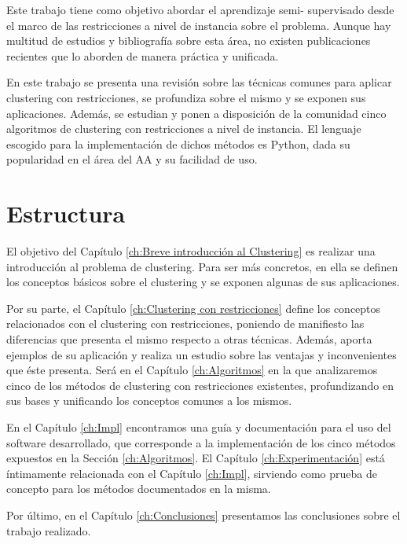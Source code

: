 Este trabajo tiene como objetivo abordar el aprendizaje semi- supervisado desde el marco de las restricciones a nivel de instancia sobre el problema. Aunque hay multitud de estudios y bibliografía sobre esta área, no existen publicaciones recientes que lo aborden de manera práctica y unificada.

En este trabajo se presenta una revisión sobre las técnicas comunes para aplicar clustering con restricciones, se profundiza sobre el mismo y se exponen sus aplicaciones. Además, se estudian y ponen a disposición de la comunidad cinco algoritmos de clustering con restricciones a nivel de instancia. El lenguaje escogido para la implementación de dichos métodos es Python, dada su popularidad en el área del \acs{AA} y su facilidad de uso.

\section{Estructura}

El objetivo del Capítulo \ref{ch:Breve introducción al Clustering} es realizar una introducción al problema de clustering. Para ser más concretos, en ella se definen los conceptos básicos sobre el clustering y se exponen algunas de sus aplicaciones.

Por su parte, el Capítulo \ref{ch:Clustering con restricciones} define los conceptos relacionados con el clustering con restricciones, poniendo de manifiesto las diferencias que presenta el mismo respecto a otras técnicas. Además, aporta ejemplos de su aplicación y realiza un estudio sobre las ventajas y inconvenientes que éste presenta. Será en el Capítulo \ref{ch:Algoritmos} en la que analizaremos cinco de los métodos de clustering con restricciones existentes, profundizando en sus bases y unificando los conceptos comunes a los mismos.

En el Capítulo \ref{ch:Impl} encontramos una guía y documentación para el uso del software desarrollado, que corresponde a la implementación de los cinco métodos expuestos en la Sección \ref{ch:Algoritmos}. El Capítulo \ref{ch:Experimentación} está íntimamente relacionada con el Capítulo \ref{ch:Impl}, sirviendo como prueba de concepto para los métodos documentados en la misma.

Por último, en el Capítulo \ref{ch:Conclusiones} presentamos las conclusiones sobre el trabajo realizado.































